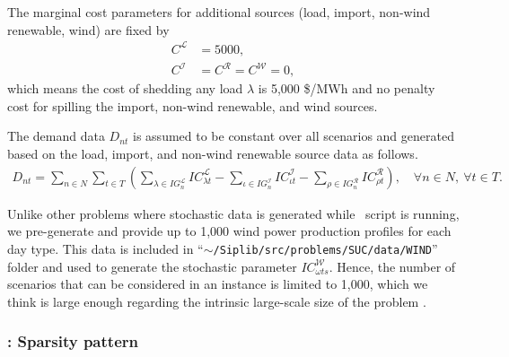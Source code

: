 The marginal cost parameters for additional sources (load, import, non-wind renewable, wind) are fixed by
\begin{align*}
C^\mathcal{L}&=5000,\\
C^\mathcal{I}&=C^\mathcal{R}=C^\mathcal{W}=0,
\end{align*}
which means the cost of shedding any load $\lambda$ is 5,000 \$/MWh and no penalty cost for spilling the import, non-wind renewable, and wind sources.

The demand data $D_{nt}$ is assumed to be constant over all scenarios and generated based on the load, import, and non-wind renewable source data as follows.
\begin{align*}
D_{nt}=\sum_{n\in N} \sum_{t\in T}\left(  \sum_{\lambda\in IG_n^\mathcal{L}}IC_{\lambda t}^\mathcal{L} - \sum_{\iota\in IG_n^\mathcal{I}}IC_{\iota t}^\mathcal{I} - \sum_{\rho\in IG_n^\mathcal{R}}IC_{\rho t}^\mathcal{R}    \right),\quad\forall n\in N,\ \forall t\in T.
\end{align*}

Unlike other problems where stochastic data is generated while \julia\ script is running, we pre-generate and provide up to 1,000 wind power production profiles for each day type. This data is included in ``\texttt{$\sim$/Siplib/src/problems/SUC/data/WIND}'' folder and used to generate the stochastic parameter $IC_{\omega ts}^\mathcal{W}$. Hence, the number of scenarios that can be considered in an instance is limited to 1,000, which we think is large enough regarding the intrinsic large-scale size of the problem \suc.

\subsubsection{\suc: Sparsity pattern}
